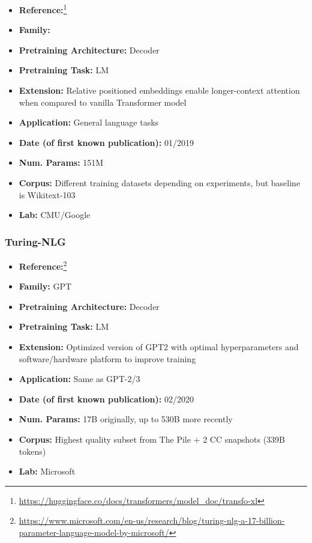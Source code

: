 \documentclass{article}
\begin{document}
            \begin{itemize}
                \item \textbf{Reference:}\footnote{\url{https://huggingface.co/docs/transformers/model_doc/transfo-xl}}\cite{dai2019transformer}
                \item \textbf{Family:} 
                \item \textbf{Pretraining Architecture:} Decoder
                \item \textbf{Pretraining Task:} LM
                \item \textbf{Extension:} Relative positioned embeddings enable longer-context attention when compared to vanilla Transformer model  
                \item \textbf{Application:} General language tasks
                \item \textbf{Date (of first known publication):} 01/2019
                \item \textbf{Num. Params:} 151M
                \item \textbf{Corpus:} Different training datasets depending on experiments, but baseline is Wikitext-103
                \item \textbf{Lab:} CMU/Google
            \end{itemize}

\subsubsection{Turing-NLG}

            \begin{itemize}
                \item \textbf{Reference:}\footnote{\url{https://www.microsoft.com/en-us/research/blog/turing-nlg-a-17-billion-parameter-language-model-by-microsoft/}}\cite{rosset2020turing}
                \item \textbf{Family:} GPT
                \item \textbf{Pretraining Architecture:} Decoder
                \item \textbf{Pretraining Task:} LM
                \item \textbf{Extension:} Optimized version of GPT2 with optimal hyperparameters and software/hardware platform to improve training
                \item \textbf{Application:} Same as GPT-2/3
                \item \textbf{Date (of first known publication):} 02/2020
                \item \textbf{Num. Params:} 17B originally, up to 530B more recently
                \item \textbf{Corpus:} Highest quality subset from The Pile + 2 CC snapshots (339B tokens)
                \item \textbf{Lab:} Microsoft
            \end{itemize}
 
\end{document}
